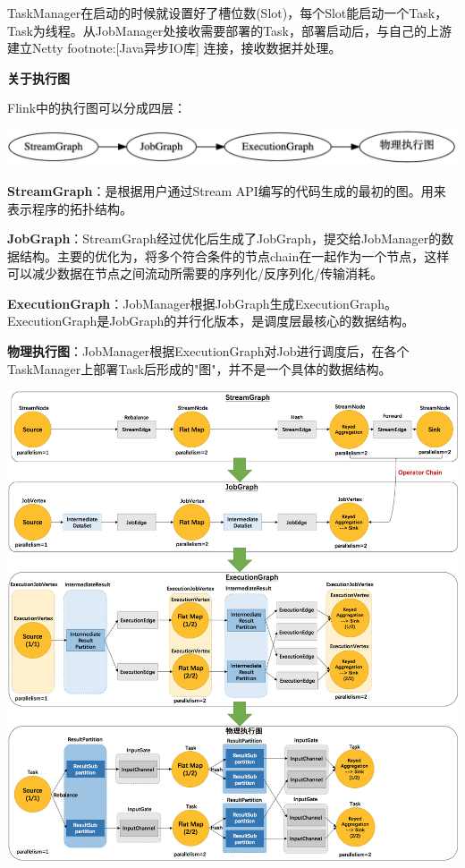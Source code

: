 \documentclass[oneside]{ctexbook}
\begin{document}
TaskManager在启动的时候就设置好了槽位数(Slot)，每个Slot能启动一个Task，Task为线程。从JobManager处接收需要部署的Task，部署启动后，与自己的上游建立Netty footnote:[Java异步IO库] 连接，接收数据并处理。

\textbf{关于执行图}

Flink中的执行图可以分成四层：

\noindent \includegraphics[width=\textwidth]{dot-example1.png}

\textbf{StreamGraph}：是根据用户通过Stream API编写的代码生成的最初的图。用来表示程序的拓扑结构。

\textbf{JobGraph}：StreamGraph经过优化后生成了JobGraph，提交给JobManager的数据结构。主要的优化为，将多个符合条件的节点chain在一起作为一个节点，这样可以减少数据在节点之间流动所需要的序列化/反序列化/传输消耗。

\textbf{ExecutionGraph}：JobManager根据JobGraph生成ExecutionGraph。ExecutionGraph是JobGraph的并行化版本，是调度层最核心的数据结构。

\textbf{物理执行图}：JobManager根据ExecutionGraph对Job进行调度后，在各个TaskManager上部署Task后形成的"图"，并不是一个具体的数据结构。

\noindent \includegraphics[width=\textwidth]{jobgraph.png}
\end{document}
